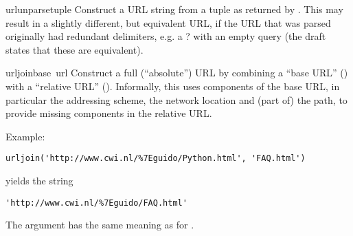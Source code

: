 \begin{funcdesc}{urlunparse}{tuple}
Construct a URL string from a tuple as returned by .
This may result in a slightly different, but equivalent URL, if the
URL that was parsed originally had redundant delimiters, e.g. a ? with
an empty query (the draft states that these are equivalent).
\end{funcdesc}

\begin{funcdesc}{urljoin}{base\, url}
Construct a full (``absolute'') URL by combining a ``base URL''
() with a ``relative URL'' ().  Informally, this
uses components of the base URL, in particular the addressing scheme,
the network location and (part of) the path, to provide missing
components in the relative URL.

Example:

\bcode\begin{verbatim}
urljoin('http://www.cwi.nl/%7Eguido/Python.html', 'FAQ.html')
\end{verbatim}\ecode
%
yields the string

\bcode\begin{verbatim}
'http://www.cwi.nl/%7Eguido/FAQ.html'
\end{verbatim}\ecode
%
The  argument has the same meaning as for
.
\end{funcdesc}
